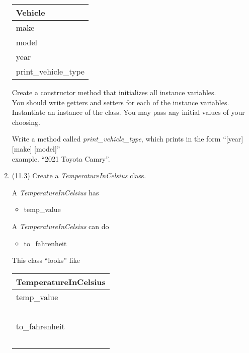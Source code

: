 \documentclass{article}
\newcommand{\tab}{\hspace*{0.25in}}
\begin{document}
\begin{enumerate}
\begin{minipage}{.4\textwidth}
		\vspace*{1em}
		\begin{tabular}{|l|}
			\hline Vehicle\\ \hline
			make\\ model\\ year\\ \hline
			print\_vehicle\_type \\  \hline
		\end{tabular}
	\end{minipage}

	\vspace*{2ex}
	Create a constructor method that initializes all instance variables.\\
	You should write getters and setters for each of the instance variables.\\
	Instantiate an instance of the class. You may pass any initial values of your choosing.

	Write a method called \textit{print\_vehicle\_type}, which prints in the form ``[year] [make] [model]''\\
	example. ``2021 Toyota Camry''.\\



\item (11.3) Create a \textit{TemperatureInCelsius} class.\\
	\begin{minipage}{.6\textwidth}		
		A \textit{TemperatureInCelsius} has
		\begin{itemize}
			\item temp\_value
		\end{itemize}

		A \textit{TemperatureInCelsius} can do
		\begin{itemize}
			\item to\_fahrenheit
		\end{itemize}
	\end{minipage}
	\begin{minipage}{.4\textwidth}
		This class ``looks'' like 
				
		\vspace*{1em}
		\begin{tabular}{|l|}
			\hline TemperatureInCelsius\\ \hline
			temp\_value\\ \ \\  \hline
			to\_fahrenheit\\ \ \\ \hline
		\end{tabular}
	\end{minipage}




\end{enumerate}
\end{document}
